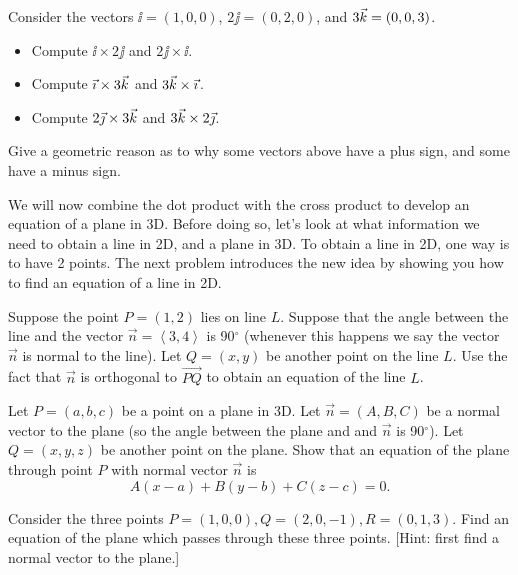 \begin{problem} 
Consider the vectors ${\ii}=(1,0,0)$, ${2\jj}=(0,2,0)$, and ${3\vec k}=(0,0,3)$.
\begin{itemize}
\item Compute $\ii\times {2\jj}$ and ${2\jj}\times {\ii}$.
\item Compute ${\vec \imath}\times {3\ensuremath{\vec k}}$ and ${3\vec k}\times {\ensuremath{\vec \imath}}$.
\item Compute ${2\vec \jmath}\times {3\ensuremath{\vec k}}$ and ${3\vec k}\times {2\ensuremath{\vec \jmath}}$.
\end{itemize}
Give a geometric reason as to why some vectors above have a plus sign, and some have a minus sign.
\end{problem}

We will now combine the dot product with the cross product to develop an equation of a plane in 3D. 
Before doing so, let's look at what information we need to obtain a line in 2D, and a plane in 3D.  
To obtain a line in 2D, one way is to have 2 points. 
The next problem introduces the new idea by showing you how to find an equation of a line in 2D. 

\begin{problem}\label{plane equation normal point}
Suppose the point $P=(1,2)$ lies on line $L$. Suppose that the angle between the line and the vector $\vec n=\left<3,4\right>$ is 90$^\circ$ (whenever this happens we say the vector $\vec n$ is normal to the line). Let $Q=(x,y)$ be another point on the line $L$. Use the fact that $\vec n$ is orthogonal to $\vec {PQ}$ to obtain an equation of the line $L$. 
\end{problem}


\begin{problem}\label{plane equation three points}%
Let $P=(a,b,c)$ be a point on a plane in 3D. Let $\vec n=(A,B,C)$ be a normal vector to the plane (so the angle between the plane and and $\vec n$ is 90$^\circ$).  Let $Q=(x,y,z)$ be another point on the plane.  Show that an equation of the plane through point $P$ with normal vector $\vec n$ is $$A(x-a)+B(y-b)+C(z-c)=0.$$
\end{problem}

\begin{problem}  %
Consider the three points $P=(1,0,0), Q=(2,0,-1), R=(0,1,3)$. Find an equation of the plane which passes through these three points.  [Hint: first find a normal vector to the plane.]
\end{problem}

